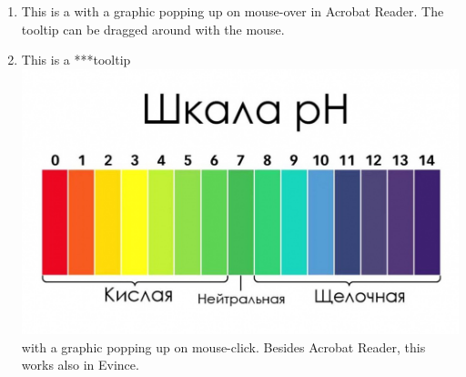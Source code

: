 \documentclass[a5paper,12pt]{scrbook}
\begin{document}
\Huge
\begin{enumerate}
  \item This is a  with a graphic popping up on mouse-over in Acrobat Reader. The tooltip can be dragged around with the mouse.
  \item This is a \tooltip****{tooltip}{\includegraphics[scale=0.2]{1.jpg}} with a graphic popping up on mouse-click. Besides Acrobat Reader, this works also in Evince.
\end{enumerate}    
\end{document}
